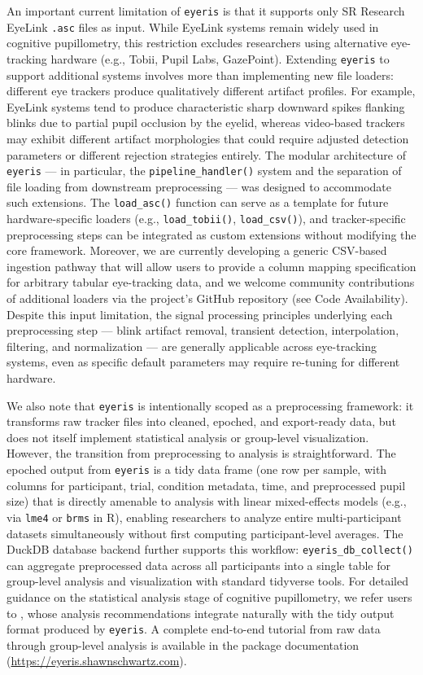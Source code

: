 An important current limitation of \texttt{eyeris} is that it supports only SR Research EyeLink \texttt{.asc} files as input. While EyeLink systems remain widely used in cognitive pupillometry, this restriction excludes researchers using alternative eye-tracking hardware (e.g., Tobii, Pupil Labs, GazePoint). Extending \texttt{eyeris} to support additional systems involves more than implementing new file loaders: different eye trackers produce qualitatively different artifact profiles. For example, EyeLink systems tend to produce characteristic sharp downward spikes flanking blinks due to partial pupil occlusion by the eyelid, whereas video-based trackers may exhibit different artifact morphologies that could require adjusted detection parameters or different rejection strategies entirely. The modular architecture of \texttt{eyeris} — in particular, the \texttt{pipeline\_handler()} system and the separation of file loading from downstream preprocessing — was designed to accommodate such extensions. The \texttt{load\_asc()} function can serve as a template for future hardware-specific loaders (e.g., \texttt{load\_tobii()}, \texttt{load\_csv()}), and tracker-specific preprocessing steps can be integrated as custom extensions without modifying the core framework. Moreover, we are currently developing a generic CSV-based ingestion pathway that will allow users to provide a column mapping specification for arbitrary tabular eye-tracking data, and we welcome community contributions of additional loaders via the project's GitHub repository (see Code Availability). Despite this input limitation, the signal processing principles underlying each preprocessing step — blink artifact removal, transient detection, interpolation, filtering, and normalization — are generally applicable across eye-tracking systems, even as specific default parameters may require re-tuning for different hardware.

We also note that \texttt{eyeris} is intentionally scoped as a preprocessing framework: it transforms raw tracker files into cleaned, epoched, and export-ready data, but does not itself implement statistical analysis or group-level visualization. However, the transition from preprocessing to analysis is straightforward. The epoched output from \texttt{eyeris} is a tidy data frame (one row per sample, with columns for participant, trial, condition metadata, time, and preprocessed pupil size) that is directly amenable to analysis with linear mixed-effects models (e.g., via \texttt{lme4} or \texttt{brms} in R), enabling researchers to analyze entire multi-participant datasets simultaneously without first computing participant-level averages. The DuckDB database backend further supports this workflow: \texttt{eyeris\_db\_collect()} can aggregate preprocessed data across all participants into a single table for group-level analysis and visualization with standard tidyverse tools. For detailed guidance on the statistical analysis stage of cognitive pupillometry, we refer users to \textcite{mathot2023methods}, whose analysis recommendations integrate naturally with the tidy output format produced by \texttt{eyeris}. A complete end-to-end tutorial from raw data through group-level analysis is available in the package documentation (\url{https://eyeris.shawnschwartz.com}).

